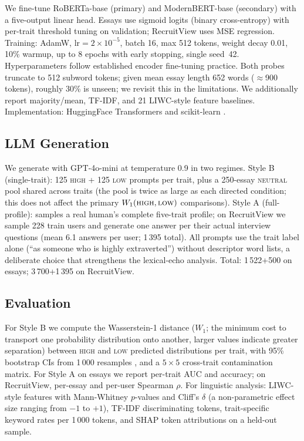 \documentclass[10pt, a4paper]{article}
\begin{document}
We fine-tune RoBERTa-base \citep{liu-etal-2019-roberta} (primary) and ModernBERT-base \citep{warner-etal-2024-modernbert} (secondary) with a five-output linear head. Essays use sigmoid logits (binary cross-entropy) with per-trait threshold tuning on validation; RecruitView uses MSE regression. Training: AdamW, $\text{lr}=2\!\times\!10^{-5}$, batch 16, max 512 tokens, weight decay 0.01, 10\% warmup, up to 8 epochs with early stopping, single seed~42. Hyperparameters follow established encoder fine-tuning practice. Both probes truncate to 512 subword tokens; given mean essay length 652 words ($\approx$900 tokens), roughly 30\% is unseen; we revisit this in the limitations. We additionally report majority/mean, TF-IDF, and 21 LIWC-style feature \citep{mohammad-turney-2013-emolex} baselines. Implementation: HuggingFace Transformers \citep{wolf-etal-2020-transformers} and scikit-learn \citep{pedregosa-etal-2011-sklearn}.

\subsection{LLM Generation}

We generate with GPT-4o-mini \citep{openai-2024-gpt4o} at temperature 0.9 in two regimes. Style B (single-trait): 125 \textsc{high} + 125 \textsc{low} prompts per trait, plus a 250-essay \textsc{neutral} pool shared across traits (the pool is twice as large as each directed condition; this does not affect the primary $W_1(\textsc{high},\textsc{low})$ comparisons). Style A (full-profile): samples a real human's complete five-trait profile; on RecruitView we sample 228 train users and generate one answer per their actual interview questions (mean 6.1 answers per user; 1\,395 total). All prompts use the trait label alone (``as someone who is highly extraverted'') without descriptor word lists, a deliberate choice that strengthens the lexical-echo analysis. Total: 1\,522+500 on essays; 3\,700+1\,395 on RecruitView.

\subsection{Evaluation}

For Style B we compute the Wasserstein-1 distance ($W_1$; the minimum cost to transport one probability distribution onto another, larger values indicate greater separation) between \textsc{high} and \textsc{low} predicted distributions per trait, with 95\% bootstrap CIs from 1\,000 resamples \citep{virtanen-etal-2020-scipy}, and a $5\!\times\!5$ cross-trait contamination matrix. For Style A on essays we report per-trait AUC and accuracy; on RecruitView, per-essay and per-user Spearman $\rho$. For linguistic analysis: LIWC-style features with Mann-Whitney $p$-values and Cliff's $\delta$ \citep{cliffs-delta-1993} (a non-parametric effect size ranging from $-1$ to $+1$), TF-IDF discriminating tokens, trait-specific keyword rates per 1\,000 tokens, and SHAP token attributions \citep{lundberg-lee-2017-shap} on a held-out sample.
\end{document}
